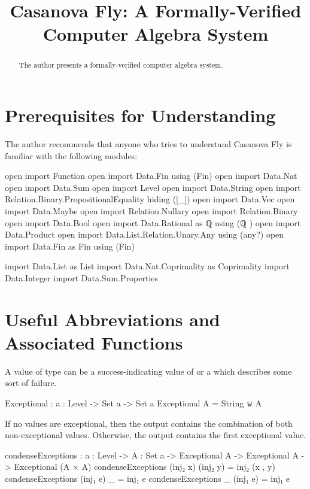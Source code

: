 \documentclass{report}
\title{Casanova Fly: A Formally-Verified Computer Algebra System}
\begin{document}
\maketitle{}

\begin{abstract}
The author presents a formally-verified computer algebra system.
\end{abstract}

\chapter{Prerequisites for Understanding}
The author recommends that anyone who tries to understand Casanova Fly is familiar with the following modules:

\begin{code}
open import Function
open import Data.Fin using (Fin)
open import Data.Nat
open import Data.Sum
open import Level
open import Data.String
open import Relation.Binary.PropositionalEquality hiding ([_])
open import Data.Vec
open import Data.Maybe
open import Relation.Nullary
open import Relation.Binary
open import Data.Bool
open import Data.Rational
  as ℚ
  using (ℚ
        )
open import Data.Product
open import Data.List.Relation.Unary.Any using (any?)
open import Data.Fin as Fin using (Fin)

import Data.List as List
import Data.Nat.Coprimality as Coprimality
import Data.Integer
import Data.Sum.Properties
\end{code}

\chapter{Useful Abbreviations and Associated Functions}
A value of type   can be a success-indicating value of  or a  which describes some sort of failure.

\begin{code}
Exceptional : {a : Level} -> Set a -> Set a
Exceptional A = String ⊎ A
\end{code}

If no values are exceptional, then the output contains the combination of both non-exceptional values.  Otherwise, the output contains the first exceptional value.

\begin{code}
condenseExceptions : {a : Level} ->
                     {A : Set a} ->
                     Exceptional A ->
                     Exceptional A ->
                     Exceptional (A × A)
condenseExceptions (inj₂ x) (inj₂ y) = inj₂ (x , y)
condenseExceptions (inj₁ e) _ = inj₁ e
condenseExceptions _ (inj₁ e) = inj₁ e
\end{code}
\end{document}
